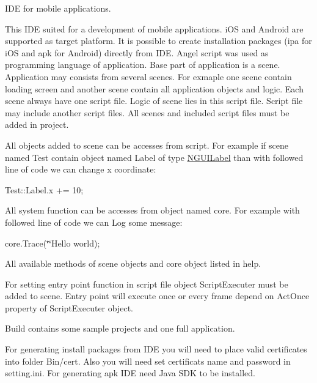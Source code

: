 I\+DE for mobile applications.

This I\+DE suited for a development of mobile applications. i\+OS and Android are supported as target platform. It is possible to create installation packages (ipa for i\+OS and apk for Android) directly from I\+DE. Angel script was used as programming language of application. Base part of application is a scene. Application may consists from several scenes. For exmaple one scene contain loading screen and another scene contain all application objects and logic. Each scene always have one script file. Logic of scene lies in this script file. Script file may include another script files. All scenes and included script files must be added in project.

All objects added to scene can be accesses from script. For example if scene named Test contain object named Label of type \hyperlink{class_n_g_u_i_label}{N\+G\+U\+I\+Label} than with followed line of code we can change x coordinate\+:

Test\+::\+Label.\+x += 10;

All system function can be accesses from object named core. For example with followed line of code we can Log some message\+:

core.\+Trace(\char`\"{}\char`\"{}Hello world);

All available methods of scene objects and core object listed in help.

For setting entry point function in script file object Script\+Executer must be added to scene. Entry point will execute once or every frame depend on Act\+Once property of Script\+Executer object.

Build contains some sample projects and one full application.

For generating install packages from I\+DE you will need to place valid certificates into folder \textquotesingle{}Bin/cert\textquotesingle{}. Also you will need set certificats name and password in setting.\+ini. For generating apk I\+DE need Java S\+DK to be installed. 